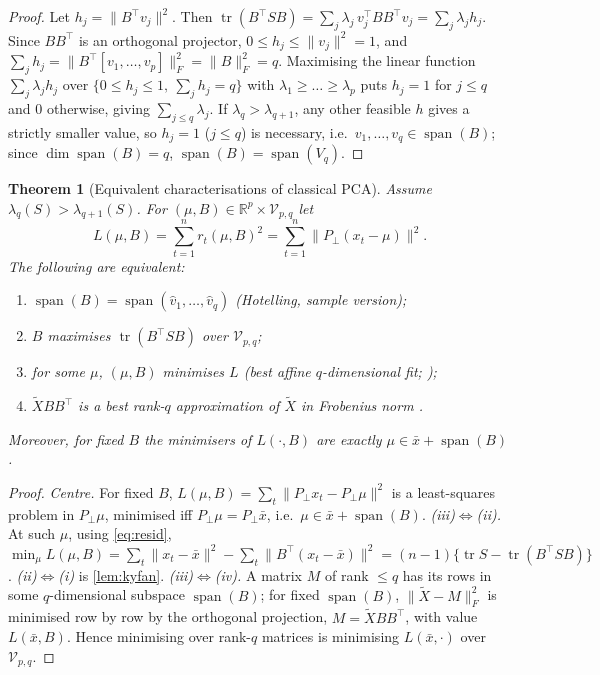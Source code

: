 \documentclass[11pt]{article}
\newtheorem{theorem}{Theorem}[section]
\theoremstyle{definition}
\theoremstyle{remark}
\DeclareMathOperator{\tr}{tr}
\DeclareMathOperator{\spn}{span}
\newcommand{\R}{\mathbb{R}}
\newcommand{\V}{\mathcal{V}}
\newcommand{\norm}[1]{\lVert #1\rVert}
\newcommand{\Pp}{P_{\!\perp}}
\begin{document}
\begin{proof}
Let $h_j=\norm{B^\top v_j}^2$. Then $\tr(B^\top SB)=\sum_j\lambda_j\,v_j^\top BB^\top v_j=\sum_j\lambda_jh_j$.
Since $BB^\top$ is an orthogonal projector, $0\le h_j\le\norm{v_j}^2=1$, and
$\sum_jh_j=\norm{B^\top[v_1,\dots,v_p]}_F^2=\norm{B}_F^2=q$.
Maximising the linear function $\sum_j\lambda_jh_j$ over $\{0\le h_j\le1,\ \sum_jh_j=q\}$ with
$\lambda_1\ge\dots\ge\lambda_p$ puts $h_j=1$ for $j\le q$ and $0$ otherwise, giving
$\sum_{j\le q}\lambda_j$. If $\lambda_q>\lambda_{q+1}$, any other feasible $h$ gives a strictly smaller value,
so $h_j=1$ ($j\le q$) is necessary, i.e.\ $v_1,\dots,v_q\in\spn(B)$; since $\dim\spn(B)=q$,
$\spn(B)=\spn(V_q)$.
\end{proof}

\begin{theorem}[Equivalent characterisations of classical PCA]\label{thm:equiv}
Assume $\lambda_q(S)>\lambda_{q+1}(S)$. For $(\mu,B)\in\R^p\times\V_{p,q}$ let
\[
L(\mu,B)=\sum_{t=1}^n r_t(\mu,B)^2=\sum_{t=1}^n\norm{\Pp(x_t-\mu)}^2 .
\]
The following are equivalent:
\begin{enumerate}[label=(\roman*)]
\item $\spn(B)=\spn(\hat v_1,\dots,\hat v_q)$ (Hotelling, sample version);
\item $B$ maximises $\tr(B^\top SB)$ over $\V_{p,q}$;
\item for some $\mu$, $(\mu,B)$ minimises $L$ (best affine $q$-dimensional fit; \citealp{Pearson1901});
\item $\tilde X BB^\top$ is a best rank-$q$ approximation of $\tilde X$ in Frobenius norm \citep{EckartYoung1936}.
\end{enumerate}
Moreover, for fixed $B$ the minimisers of $L(\cdot,B)$ are exactly $\mu\in\bar x+\spn(B)$.
\end{theorem}

\begin{proof}
\emph{Centre.} For fixed $B$, $L(\mu,B)=\sum_t\norm{\Pp x_t-\Pp\mu}^2$ is a least-squares problem in
$\Pp\mu$, minimised iff $\Pp\mu=\Pp\bar x$, i.e.\ $\mu\in\bar x+\spn(B)$.
\emph{(iii)$\Leftrightarrow$(ii).} At such $\mu$, using \eqref{eq:resid},
$\min_\mu L(\mu,B)=\sum_t\norm{x_t-\bar x}^2-\sum_t\norm{B^\top(x_t-\bar x)}^2=(n-1)\{\tr S-\tr(B^\top SB)\}$.
\emph{(ii)$\Leftrightarrow$(i)} is \cref{lem:kyfan}.
\emph{(iii)$\Leftrightarrow$(iv).} A matrix $M$ of rank $\le q$ has its rows in some $q$-dimensional subspace
$\spn(B)$; for fixed $\spn(B)$, $\norm{\tilde X-M}_F^2$ is minimised row by row by the orthogonal projection,
$M=\tilde XBB^\top$, with value $L(\bar x,B)$. Hence minimising over rank-$q$ matrices is minimising
$L(\bar x,\cdot)$ over $\V_{p,q}$.
\end{proof}
\end{document}
